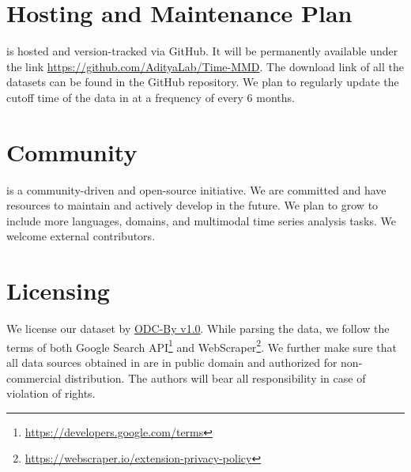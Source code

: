 \section{Hosting and Maintenance Plan}

\model is hosted and version-tracked via GitHub. It will be permanently available under the link \url{https://github.com/AdityaLab/Time-MMD}. The download link of all the datasets can be found in the GitHub repository. We plan to regularly update the cutoff time of the data in \model at a frequency of every 6 months.

\section{\model Community}

\model is a community-driven and open-source initiative. We are committed and have resources to maintain and actively develop \model in the future. We plan to grow \model to include more languages, domains, and multimodal time series analysis tasks. We welcome external contributors.


\section{Licensing}

We license our dataset by \href{http://opendatacommons.org/licenses/by/1.0/}{ODC-By v1.0}. While parsing the data, we follow the terms of both Google Search API\footnote{\url{https://developers.google.com/terms}} and WebScraper\footnote{\url{https://webscraper.io/extension-privacy-policy}}. We further make sure that all data sources obtained in \model are in public domain and authorized for non-commercial distribution. The authors will bear all responsibility in case of violation of rights.